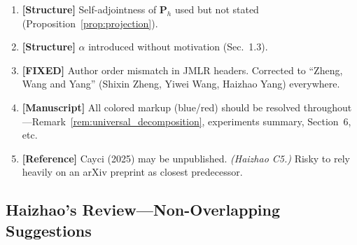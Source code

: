 \documentclass[twoside,11pt]{article}
\begin{document}
\begin{enumerate}
\item {\color{red}\textbf{[Structure]} Self-adjointness of $\mathbf{P}_h$ used but not stated}
    (Proposition~\ref{prop:projection}).

\item {\color{red}\textbf{[Structure]} $\alpha$ introduced without motivation} (Sec.~1.3).

\item {\color{green!50!black}\textbf{[FIXED]} Author order mismatch in JMLR headers.}
    Corrected to ``Zheng, Wang and Yang'' (Shixin Zheng, Yiwei Wang, Haizhao Yang) everywhere.

\item {\color{red}\textbf{[Manuscript]} All colored markup (blue/red) should be resolved}
    throughout---Remark~\ref{rem:universal_decomposition}, experiments summary, Section~6, etc.

\item {\color{red}\textbf{[Reference]} Cayci (2025) may be unpublished.}
    \emph{(Haizhao C5.)} Risky to rely heavily on an arXiv preprint as closest predecessor.
\end{enumerate}

\subsection*{Haizhao's Review---Non-Overlapping Suggestions}
\end{document}
